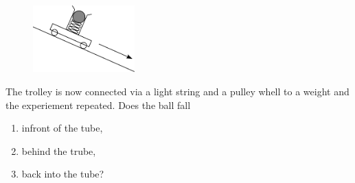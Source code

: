 	\subsection{}
		\begin{figure}
		  \vspace{-20pt}
		  \begin{center}
		  	\includegraphics[width=0.35\textwidth]{trolley3.pdf}
		  \end{center}
		  \vspace{-20pt}
		\end{figure}
		The trolley is now connected via a light string and a pulley whell to a weight and the experiement repeated. Does the ball fall
		\begin{enumerate}[label=\alph*)]
			\item infront of the tube,
			\item behind the trube,
			\item back into the tube?
		\end{enumerate}

